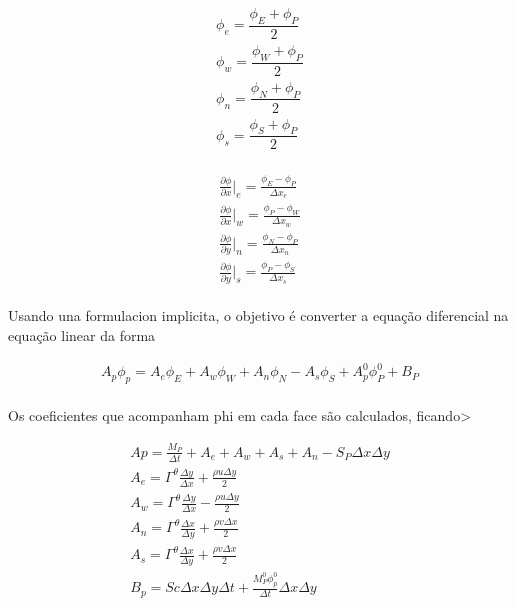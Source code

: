 \documentclass[]{article}
\begin{document}
\begin{equation}
	\begin{aligned}
		\phi_{e} = \dfrac{\phi_{E} + \phi_{P}}{2} \\
		\phi_{w} = \dfrac{\phi_{W} + \phi_{P}}{2} \\
		\phi_{n} = \dfrac{\phi_{N} + \phi_{P}}{2} \\
		\phi_{s} = \dfrac{\phi_{S} + \phi_{P}}{2} \\
	\end{aligned}
\end{equation}

\begin{equation}
	\begin{aligned}
		\frac{\partial\phi}{\partial x}\bigg|_{e} = \frac{\phi_{E}-\phi_{P}}{\Delta x_{e}}\\
		\frac{\partial\phi}{\partial x}\bigg|_{w} = \frac{\phi_{P}-\phi_{W}}{\Delta x_{w}}\\
		\frac{\partial\phi}{\partial y}\bigg|_{n} = \frac{\phi_{N}-\phi_{P}}{\Delta x_{n}}\\
		\frac{\partial\phi}{\partial y}\bigg|_{s} = \frac{\phi_{P}-\phi_{S}}{\Delta x_{s}}
	\end{aligned}
\end{equation}
\\
Usando una formulacion implicita, o objetivo é converter a equação diferencial na equação linear da forma

\begin{equation}
	\begin{aligned}
		A_p\phi_p= A_e\phi_E + A_w\phi_W + A_n\phi_N - A_s\phi_S + A_p^{0}\phi_P^{0} + B_P
	\end{aligned}
\end{equation}\\

Os coeficientes que acompanham phi em cada face são calculados, ficando>

\begin{equation}
	\begin{aligned}
		Ap = \frac{M_P}{\Delta t} + A_e + A_w + A_s + A_n - S_P\Delta x \Delta y\\
		A_e = \varGamma^{\theta}\frac{\Delta y}{\Delta x} + \frac{\rho u \Delta y}{2}\\
		A_w = \varGamma^{\theta}\frac{\Delta y}{\Delta x} - \frac{\rho u \Delta y}{2}\\
		A_n = \varGamma^{\theta}\frac{\Delta x}{\Delta y} + \frac{\rho v \Delta x}{2}\\
		A_s = \varGamma^{\theta}\frac{\Delta x}{\Delta y} + \frac{\rho v \Delta x}{2}\\
		B_p = Sc\Delta x \Delta y \Delta t + \frac{M_P^{0}\phi_p^{0}}{\Delta t}\Delta x \Delta y
	\end{aligned}
\end{equation}\\
\end{document}

